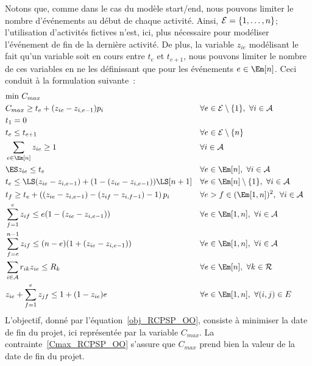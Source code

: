 Notons que, comme dans le cas du modèle start/end, nous pouvons
limiter le nombre d'événements au début de chaque activité. Ainsi,
${\cal E}=\{1,\dots,n\}$; l'utilisation d'activités fictives
n'est, ici, plus nécessaire pour modéliser l'événement de fin de
la dernière activité. De plus, la variable $z_{ie}$ modélisant le fait
qu'un variable soit en cours entre $t_e$ et $t_{e+1}$, nous pouvons
limiter le nombre de ces variables en ne les définissant que pour les
événements $e \in \Em[n]$. Ceci conduit à la formulation
suivante~\cite{modele_RCPSP}: {\small \begin{align} & \text{min } C_{max}
\label{obj_RCPSP_OO}\\ &C_{max} \ge t_e+ (z_{ie}-z_{i,e-1})p_i & &
\forall e \in {\cal E}\setminus\{1\},\ \forall i \in {\cal A}
\label{Cmax_RCPSP_OO}\\ &t_1=0 & & \label{t0_RCPSP_OO}\\ &t_e \le
t_{e+1} & &\forall e \in {\cal E}\setminus\{n\}
\label{ordre_RCPSP_OO}\\ &\sum_{e \in \Em[n]} z_{ie} \ge 1 & &
\forall i \in {\cal A} \label{start_RCPSP_OO}\\ & \ES z_{ie}\le
t_e & & \forall e \in \Em[n],\ \forall i \in {\cal A}
\label{ES_RCPSP_OO} \\ & t_e \le
\LS(z_{ie}-z_{i,e-1})+(1-(z_{ie}-z_{i,e-1}))\LS[n+1] & & \forall e
\in \Em[n]\setminus\{1\},\ \forall i \in {\cal A}
\label{LS_RCPSP_OO}\\ &t_f\ge t_e
+\left((z_{ie}-z_{i,e-1})-(z_{if}-z_{i,f-1})-1\right)p_i & & \forall
e>f \in (\Em[1,n])^2,\ \forall i \in {\cal
A}\label{dur_RCPSP_OO}\\ &\sum_{f=1}^{e} z_{if} \le
e(1-(z_{ie}-z_{i,e-1})) & & \forall e \in \Em[1,n],\
\forall i \in {\cal A}\label{preem1_RCPSP_OO}\\ &\sum_{f=e}^{n-1}
z_{if} \le (n-e)(1+(z_{ie}-z_{i,e-1})) & & \forall e \in \Em[1,n],\ 
\forall i \in {\cal A}\label{preem2_RCPSP_OO}\\
&\sum_{i \in {\cal A}} r_{ik}z_{ie} \le R_k & &\forall e \in \Em[n]
,\ \forall k \in {\cal R} \label{res_RCPSP_OO}\\
&z_{ie}+\sum_{f=1}^e z_{jf} \le 1 + (1-z_{ie})e & & \forall e \in
\Em[1,n],\ \forall (i,j) \in E \label{prec_RCPSP_OO}
\end{align}
}
L'objectif, donné par l'équation~\eqref{obj_RCPSP_OO}, 
consiste à minimiser la date de fin du projet, ici
représentée par la variable $C_{max}$. La
contrainte~\eqref{Cmax_RCPSP_OO} s'assure que $C_{max}$ prend bien
la valeur de la date de fin du projet.

